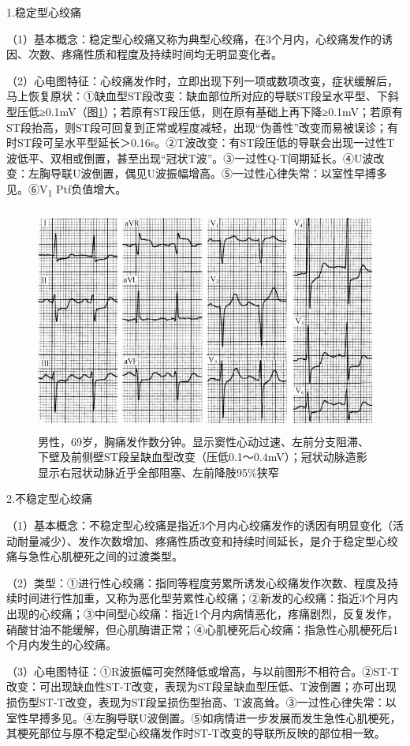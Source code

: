 1.稳定型心绞痛

（1）基本概念：稳定型心绞痛又称为典型心绞痛，在3个月内，心绞痛发作的诱因、次数、疼痛性质和程度及持续时间均无明显变化者。

（2）心电图特征：心绞痛发作时，立即出现下列一项或数项改变，症状缓解后，马上恢复原状：①缺血型ST段改变：缺血部位所对应的导联ST段呈水平型、下斜型压低≥0.1mV（图\ref{fig42-1}）；若原有ST段压低，则在原有基础上再下降≥0.1mV；若原有ST段抬高，则ST段可回复到正常或程度减轻，出现“伪善性”改变而易被误诊；有时ST段可呈水平型延长＞0.16s。②T波改变：有ST段压低的导联会出现一过性T波低平、双相或倒置，甚至出现“冠状T波”。③一过性Q-T间期延长。④U波改变：左胸导联U波倒置，偶见U波振幅增高。⑤一过性心律失常：以室性早搏多见。⑥V\textsubscript{1}
Ptf负值增大。

\begin{figure}[!htbp]
 \centering
 \includegraphics[width=4.75in,height=2.90625in]{./images/Image00692.jpg}
 \captionsetup{justification=centering}
 \caption{男性，69岁，胸痛发作数分钟。显示窦性心动过速、左前分支阻滞、下壁及前侧壁ST段呈缺血型改变（压低0.1～0.4mV）；冠状动脉造影显示右冠状动脉近乎全部阻塞、左前降肢95\%狭窄}
 \label{fig42-1}
  \end{figure} 

2.不稳定型心绞痛

（1）基本概念：不稳定型心绞痛是指近3个月内心绞痛发作的诱因有明显变化（活动耐量减少）、发作次数增加、疼痛性质改变和持续时间延长，是介于稳定型心绞痛与急性心肌梗死之间的过渡类型。

（2）类型：①进行性心绞痛：指同等程度劳累所诱发心绞痛发作次数、程度及持续时间进行性加重，又称为恶化型劳累性心绞痛；②新发的心绞痛：指近3个月内出现的心绞痛；③中间型心绞痛：指近1个月内病情恶化，疼痛剧烈，反复发作，硝酸甘油不能缓解，但心肌酶谱正常；④心肌梗死后心绞痛：指急性心肌梗死后1个月内发生的心绞痛。

（3）心电图特征：①R波振幅可突然降低或增高，与以前图形不相符合。②ST-T改变：可出现缺血性ST-T改变，表现为ST段呈缺血型压低、T波倒置；亦可出现损伤型ST-T改变，表现为ST段呈损伤型抬高、T波高耸。③一过性心律失常：以室性早搏多见。④左胸导联U波倒置。⑤如病情进一步发展而发生急性心肌梗死，其梗死部位与原不稳定型心绞痛发作时ST-T改变的导联所反映的部位相一致。

